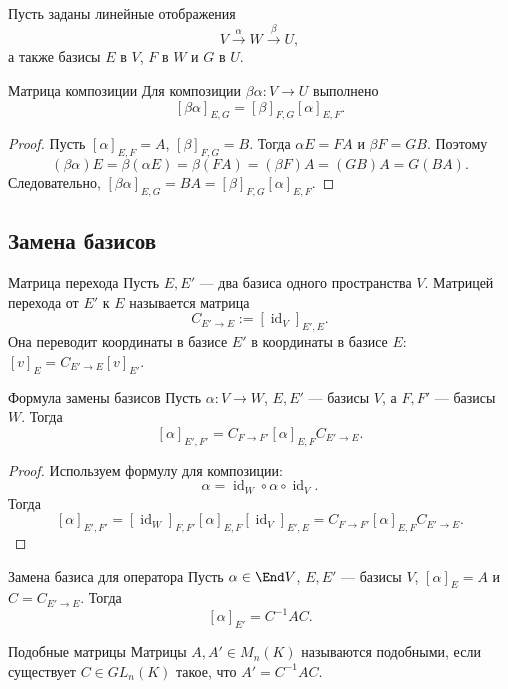 Пусть заданы линейные отображения
\[
V \xrightarrow{\alpha} W \xrightarrow{\beta} U,
\]
а также базисы $E$ в $V$, $F$ в $W$ и $G$ в $U$.

\begin{Theorem}{Матрица композиции}{}
	Для композиции $\beta\alpha\colon V\to U$ выполнено
	\[
	[\beta\alpha]_{E,G}
	=
	[\beta]_{F,G}[\alpha]_{E,F}.
	\]
\end{Theorem}

\begin{proof}
	Пусть $[\alpha]_{E,F}=A$, $[\beta]_{F,G}=B$. Тогда
	$\alpha E=FA$ и $\beta F=GB$. Поэтому
	\[
	(\beta\alpha)E
	=
	\beta(\alpha E)
	=
	\beta(FA)
	=
	(\beta F)A
	=
	(GB)A
	=
	G(BA).
	\]
	Следовательно, $[\beta\alpha]_{E,G}=BA=[\beta]_{F,G}[\alpha]_{E,F}$.
\end{proof}

\subsection{Замена базисов}

\begin{Definition}{Матрица перехода}{}
	Пусть $E,E'$ --- два базиса одного пространства $V$.
	Матрицей перехода от $E'$ к $E$ называется матрица
	\[
	C_{E'\to E}:=[\operatorname{id}_V]_{E',E}.
	\]
	Она переводит координаты в базисе $E'$ в координаты в базисе $E$:
	$[v]_E=C_{E'\to E}[v]_{E'}$.
\end{Definition}

\begin{Theorem}{Формула замены базисов}{}
	Пусть $\alpha\colon V\to W$, $E,E'$ --- базисы $V$, а $F,F'$ --- базисы $W$.
	Тогда
	\[
	[\alpha]_{E',F'}
	=
	C_{F\to F'}[\alpha]_{E,F}C_{E'\to E}.
	\]
\end{Theorem}

\begin{proof}
	Используем формулу для композиции:
	\[
	\alpha
	=
	\operatorname{id}_W\circ \alpha\circ \operatorname{id}_V.
	\]
	Тогда
	\[
	[\alpha]_{E',F'}
	=
	[\operatorname{id}_W]_{F,F'}
	[\alpha]_{E,F}
	[\operatorname{id}_V]_{E',E}
	=
	C_{F\to F'}[\alpha]_{E,F}C_{E'\to E}.
	\]
\end{proof}

\begin{Corollary}{Замена базиса для оператора}{}
	Пусть $\alpha\in \End V$, $E,E'$ --- базисы $V$, $[\alpha]_E=A$ и $C=C_{E'\to E}$.
	Тогда
	\[
	[\alpha]_{E'}=C^{-1}AC.
	\]
\end{Corollary}

\begin{Definition}{Подобные матрицы}{}
	Матрицы $A,A'\in M_n(K)$ называются подобными, если существует $C\in GL_n(K)$ такое, что
	$A'=C^{-1}AC$.
\end{Definition}

